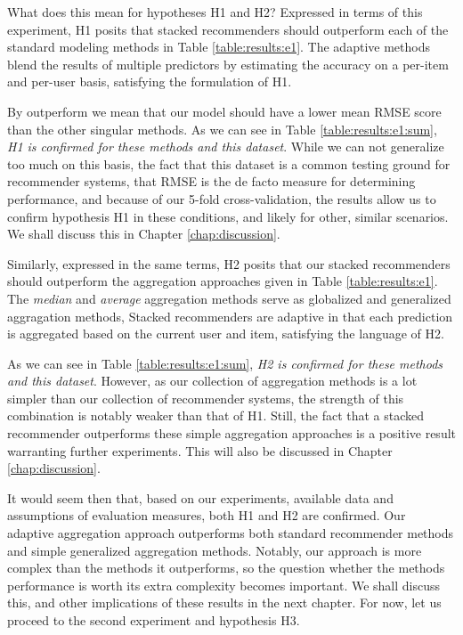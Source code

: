 What does this mean for hypotheses H1 and H2?
Expressed in terms of this experiment,
H1 posits that stacked recommenders should outperform each of the standard modeling methods
in Table \ref{table:results:e1}.
The adaptive methods blend the results of multiple predictors by estimating the accuracy
on a per-item and per-user basis, satisfying the formulation of H1.

By outperform we mean that our model should have a lower
mean RMSE score than the other singular methods. As we can see in Table \ref{table:results:e1:sum},
\emph{H1 is confirmed for these methods and this dataset}.
While we can not generalize too much on this basis, 
the fact that this dataset is a common testing ground for recommender systems,
that RMSE is the de facto measure for determining performance,
and because of our 5-fold cross-validation, the results allow us 
to confirm hypothesis H1 in these conditions, and likely for other, similar scenarios.
We shall discuss this in Chapter \ref{chap:discussion}.

Similarly, expressed in the same terms, H2 posits that 
our stacked recommenders should outperform the aggregation approaches
given in Table \ref{table:results:e1}.
The \emph{median} and \emph{average} aggregation methods
serve as globalized and generalized aggragation methods,
Stacked recommenders are adaptive in that each prediction is 
aggregated based on the current user and item,
satisfying the language of H2.

As we can see in Table \ref{table:results:e1:sum},
\emph{H2 is confirmed for these methods and this dataset}.
However, as our collection of aggregation methods is a lot simpler
than our collection of recommender systems, the strength of this combination
is notably weaker than that of H1.
Still, the fact that a stacked recommender outperforms these simple aggregation
approaches is a positive result warranting further experiments.
This will also be discussed in Chapter \ref{chap:discussion}.

It would seem then that, based on our experiments, available data
and assumptions of evaluation measures, both H1 and H2 are confirmed.
Our adaptive aggregation approach outperforms both standard recommender
methods and simple generalized aggregation methods.
Notably, our approach is more complex than the methods it outperforms,
so the question whether the methods performance is worth its extra complexity becomes important.
We shall discuss this, and other implications of these results in the next chapter.
For now, let us proceed to the second experiment and hypothesis H3.


